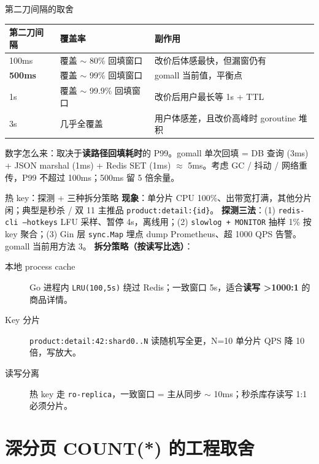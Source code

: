 \documentclass[aspectratio=169,11pt]{beamer}
\begin{document}
\begin{frame}[shrink]{第二刀间隔的取舍}
\begin{tabular}{@{}lll@{}}
\toprule
第二刀间隔 & 覆盖率 & 副作用 \\
\midrule
100ms & 覆盖 $\sim$ 80\% 回填窗口 & 改价后体感最快，但漏窗仍有 \\
\textbf{500ms} & 覆盖 $\sim$ 99\% 回填窗口 & gomall 当前值，平衡点 \\
1s    & 覆盖 $\sim$ 99.9\% 回填窗口 & 改价后用户最长等 1s + TTL \\
3s    & 几乎全覆盖 & 用户体感差，且改价高峰时 goroutine 堆积 \\
\bottomrule
\end{tabular}
\vspace{3mm}
\small 数字怎么来：取决于\textbf{读路径回填耗时}的 P99。gomall 单次回填 = DB 查询 (3ms) + JSON marshal (1ms) + Redis SET (1ms) $\approx$ 5ms。考虑 GC / 抖动 / 网络重传，P99 不超过 100ms；500ms 留 5 倍余量。
\end{frame}

\begin{frame}[shrink]{热 key：探测 + 三种拆分策略}
\small
\textbf{现象}：单分片 CPU 100\%、出带宽打满，其他分片闲；典型是秒杀 / 双 11 主推品 \texttt{product:detail:\{id\}}。
\vspace{1mm}
\textbf{探测三法}：(1) \texttt{redis-cli --hotkeys} LFU 采样、暂停 4s，离线用；(2) \texttt{slowlog + MONITOR} 抽样 1\% 按 key 聚合；(3) Gin 层 \texttt{sync.Map} 埋点 dump Prometheus、超 1000 QPS 告警。gomall 当前用方法 3。
\vspace{1mm}
\textbf{拆分策略（按读写比选）}：
\begin{description}
  \item[本地 process cache] Go 进程内 \texttt{LRU(100,5s)} 绕过 Redis；一致窗口 5s，适合\textbf{读写 \textgreater 1000:1} 的商品详情。
  \item[Key 分片] \texttt{product:detail:42:shard0..N} 读随机写全更，N=10 单分片 QPS 降 10 倍，写放大。
  \item[读写分离] 热 key 走 \texttt{ro-replica}，一致窗口 = 主从同步 $\sim$ 10ms；秒杀库存读写 1:1 必须分片。
\end{description}
\end{frame}

\section{深分页 COUNT(*) 的工程取舍}
\end{document}
